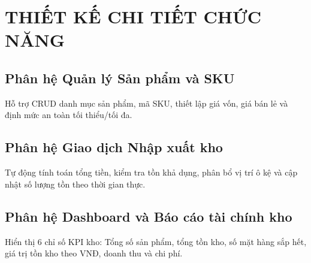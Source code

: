 \chapter{THIẾT KẾ CHI TIẾT CHỨC NĂNG}
\label{ch:07}

\section{Phân hệ Quản lý Sản phẩm và SKU}
Hỗ trợ CRUD danh mục sản phẩm, mã SKU, thiết lập giá vốn, giá bán lẻ và định mức an toàn tối thiểu/tối đa.

\section{Phân hệ Giao dịch Nhập xuất kho}
Tự động tính toán tổng tiền, kiểm tra tồn khả dụng, phân bổ vị trí ô kệ và cập nhật số lượng tồn theo thời gian thực.

\section{Phân hệ Dashboard và Báo cáo tài chính kho}
Hiển thị 6 chỉ số KPI kho: Tổng số sản phẩm, tổng tồn kho, số mặt hàng sắp hết, giá trị tồn kho theo VNĐ, doanh thu và chi phí.
